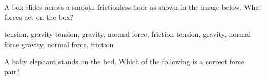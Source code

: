 \documentclass[answers]{exam}
\begin{document}
\begin{questions}




\question %
A box slides across a smooth frictionless floor as shown in the image below.  What forces act on the box?

\begin{center}
\end{center}


\begin{randomizechoices}[norandomize]
    \choice tension, gravity
    \choice tension, gravity, normal force, friction
    \correctchoice tension, gravity, normal force
    \choice gravity, normal force, friction
\end{randomizechoices}

\question 
A baby elephant stands on the bed. Which of the following is a correct force pair?

\begin{center}
\end{center}


\end{questions}
\end{document}
